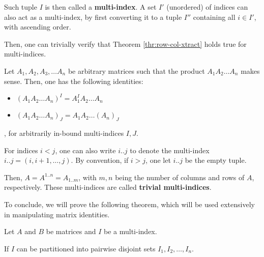 Such tuple \( I \) is then called a \textbf{multi-index}. A set \( I' \)
(unordered) of indices can also act as a multi-index, by first converting it to
a tuple \( I'' \) containing all \( i \in I' \), with ascending order.

Then, one can trivially verify that Theorem \ref{thr:row-col-xtract} holds true
for multi-indices.

\begin{theorem}
  Let \( A_{1}, A_{2}, A_{3}, \ldots A_{n} \) be arbitrary matrices such that
  the product \( A_{1}A_{2}\ldots A_{n}  \) makes sense. Then, one has the
  following identities:

  \begin{itemize}
    \item \( (A_{1}A_{2}\ldots A_{n})^{I} = A_{1}^{I}A_{2}\ldots A_{n} \)
    \item \( (A_{1}A_{2}\ldots A_{n})_{J} = A_{1}A_{2}\ldots (A_{n})_{J} \)
  \end{itemize}, for arbitrarily in-bound multi-indices \( I, J \).
\end{theorem}

For indices \( i < j \), one can also write \( i .. j \) to denote the
multi-index \( i .. j = (i, i + 1, \ldots , j) \). By convention, if \( i > j
\), one let \( i .. j \) be the empty tuple.

Then, \( A = A^{1..n} = A_{1..m} \), with \( m,n  \) being the number of columns
and rows of \( A \), respectively. These multi-indices are called
\textbf{trivial multi-indices}.

To conclude, we will prove the following theorem, which will be used extensively
in manipulating matrix identities.

\begin{theorem}
  Let \( A \) and \( B \) be matrices and \( I \) be a multi-index.

  If \( I \) can be partitioned into pairwise disjoint sets \( I_{1}, I_{2}, \ldots,
  I_{n} \). 
\end{theorem}





